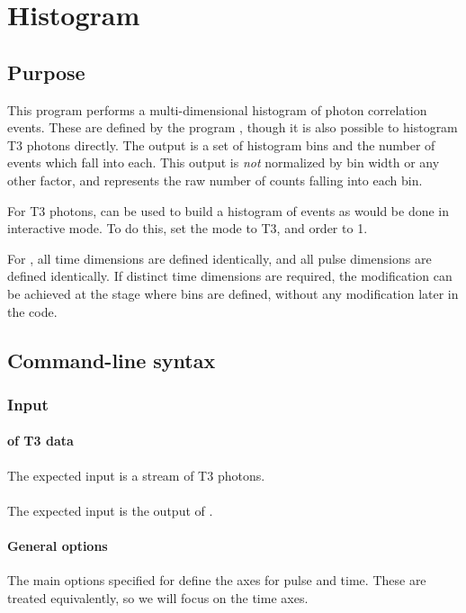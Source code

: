 \section{Histogram}
\label{sec:histogram}

\subsection{Purpose}
This program performs a multi-dimensional histogram of photon correlation events. These are defined by the program , though it is also possible to histogram T3 photons directly. The output is a set of histogram bins and the number of events which fall into each. This output is \textit{not} normalized by bin width or any other factor, and represents the raw number of counts falling into each bin.

For T3 photons,  can be used to build a histogram of events as would be done in interactive mode. To do this, set the mode to T3, and order to 1.

For , all time dimensions are defined identically, and all pulse dimensions are defined identically. If distinct time dimensions are required, the modification can be achieved at the stage where bins are defined, without any modification later in the code.

\subsection{Command-line syntax}


\subsubsection{Input}
\paragraph{ of T3 data}
The expected input is a stream of T3 photons.

\paragraph{}
The expected input is the output of .

\paragraph{General options}
The main options specified for  define the axes for pulse and time. These are treated equivalently, so we will focus on the time axes.

